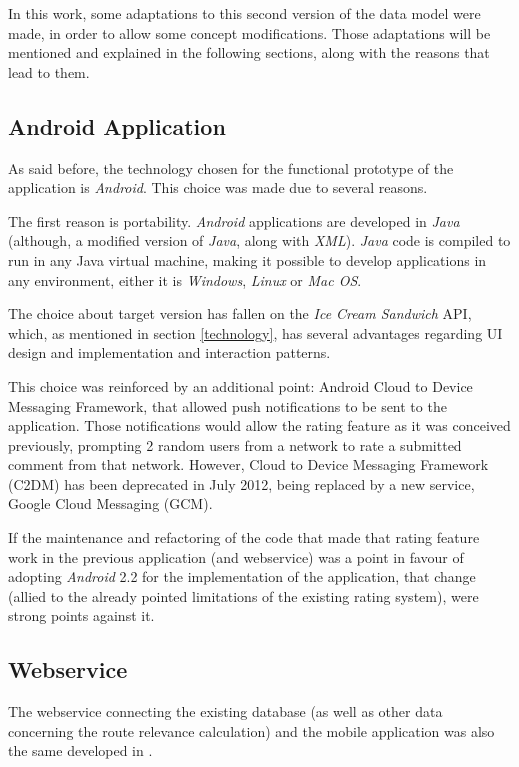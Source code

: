 In this work, some adaptations to this second version of the data model were made, in order to allow some concept modifications. Those adaptations will be mentioned and explained in the following sections, along with the reasons that lead to them.

\subsection{Android Application}

As said before, the technology chosen for the functional prototype of the application is \emph{Android}. This choice was made due to several reasons. 

The first reason is portability. \emph{Android} applications are developed in \emph{Java} (although, a modified version of \emph{Java}, along with \emph{XML}). \emph{Java} code is compiled to run in any Java virtual machine, making it possible to develop applications in any environment, either it is \emph{Windows}, \emph{Linux} or \emph{Mac OS}.

The choice about target version has fallen on the \emph{Ice Cream Sandwich} API, which, as mentioned in section \ref{technology}, has several advantages regarding UI design and implementation and interaction patterns. 

This choice was reinforced by an additional point: Android Cloud to Device Messaging Framework, that allowed push notifications to be sent to the application. Those notifications would allow the rating feature as it was conceived previously, prompting 2 random users from a network to rate a submitted comment from that network. However, Cloud to Device Messaging Framework (C2DM) has been deprecated in July 2012, being replaced by a new service, Google Cloud Messaging (GCM).

If the maintenance and refactoring of the code that made that rating feature work in the previous application (and webservice) was a point in favour of adopting \emph{Android} 2.2 for the implementation of the application, that change (allied to the already pointed limitations of the existing rating system), were strong points against it.

\subsection{Webservice}

The webservice connecting the existing database (as well as other data concerning the route relevance calculation) and the mobile application was also the same developed in \cite{kn:eSG12}.

